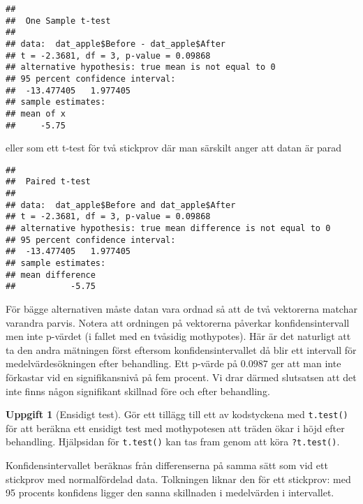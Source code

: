 \documentclass[
]{book}
\newenvironment{Shaded}{\begin{snugshade}}{\end{snugshade}}
\newcommand{\AttributeTok}[1]{\textcolor[rgb]{0.77,0.63,0.00}{#1}}
\newcommand{\FunctionTok}[1]{\textcolor[rgb]{0.00,0.00,0.00}{#1}}
\newcommand{\NormalTok}[1]{#1}
\newcommand{\SpecialCharTok}[1]{\textcolor[rgb]{0.00,0.00,0.00}{#1}}
\theoremstyle{definition}
\theoremstyle{definition}
\theoremstyle{definition}
\newtheorem{exercise}{Uppgift}[chapter]
\theoremstyle{definition}
\theoremstyle{remark}
\begin{document}
\begin{verbatim}
## 
##  One Sample t-test
## 
## data:  dat_apple$Before - dat_apple$After
## t = -2.3681, df = 3, p-value = 0.09868
## alternative hypothesis: true mean is not equal to 0
## 95 percent confidence interval:
##  -13.477405   1.977405
## sample estimates:
## mean of x 
##     -5.75
\end{verbatim}

eller som ett t-test för två stickprov där man särskilt anger att datan är parad

\begin{Shaded}
\end{Shaded}

\begin{verbatim}
## 
##  Paired t-test
## 
## data:  dat_apple$Before and dat_apple$After
## t = -2.3681, df = 3, p-value = 0.09868
## alternative hypothesis: true mean difference is not equal to 0
## 95 percent confidence interval:
##  -13.477405   1.977405
## sample estimates:
## mean difference 
##           -5.75
\end{verbatim}

För bägge alternativen måste datan vara ordnad så att de två vektorerna matchar varandra parvis. Notera att ordningen på vektorerna påverkar konfidensintervall men inte p-värdet (i fallet med en tvåsidig mothypotes). Här är det naturligt att ta den andra mätningen först eftersom konfidensintervallet då blir ett intervall för medelvärdesökningen efter behandling. Ett p-värde på \(0.0987\) ger att man inte förkastar vid en signifikansnivå på fem procent. Vi drar därmed slutsatsen att det inte finns någon signifikant skillnad före och efter behandling.

\begin{exercise}[Ensidigt test]
Gör ett tillägg till ett av kodstyckena med \texttt{t.test()} för att beräkna ett ensidigt test med mothypotesen att träden ökar i höjd efter behandling. Hjälpsidan för \texttt{t.test()} kan tas fram genom att köra \texttt{?t.test()}.
\end{exercise}

Konfidensintervallet beräknas från differenserna på samma sätt som vid ett stickprov med normalfördelad data. Tolkningen liknar den för ett stickprov: med 95 procents konfidens ligger den sanna skillnaden i medelvärden i intervallet.
\end{document}
